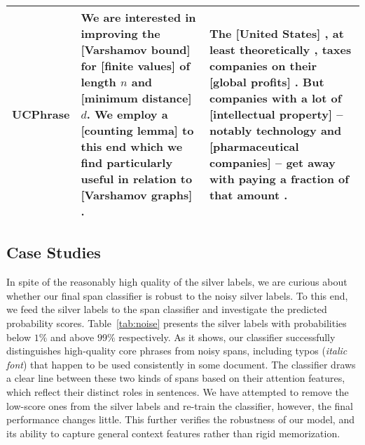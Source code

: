 \documentclass[sigconf]{acmart}
\newcommand{\our}{\mbox{UCPhrase}\xspace}
\newcommand{\catag}[1]{\textcolor{ggreen}{[\textbf{#1}]}}
\begin{document}
\begin{table*}[t]
{\begin{tabular}{@{}r@{\hskip 1em}p{}@{\hskip 2em}p{}@{}}
            \\
            \textbf{\our}
            &
            We are interested in improving the \catag{Varshamov bound} for \catag{finite values} of length $n$ and \catag{minimum distance} $d$. We employ a \catag{counting lemma} to this end which we find particularly useful in relation to \catag{Varshamov graphs} .
            &
            The \catag{United States} , at least theoretically , taxes companies on their \catag{global profits} .
            But companies with a lot of \catag{intellectual property} -- notably technology and \catag{pharmaceutical companies} -- get away with paying a fraction of that amount .
            \\
            
            
            
            \bottomrule
        \end{tabular}
        }
    \vspace{-3mm}
\end{table*} \subsection{Case Studies}
\label{sec:case_study}

In spite of the reasonably high quality of the silver labels, we are curious about whether our final span classifier is robust to the noisy silver labels.
To this end, we feed the silver labels to the span classifier and investigate the predicted probability scores.
Table~\ref{tab:noise} presents the silver labels with probabilities below $1\%$ and above $99\%$ respectively.
As it shows, our classifier successfully distinguishes high-quality core phrases from noisy spans, including typos (\emph{italic font}) that happen to be used consistently in some document.
The classifier draws a clear line between these two kinds of spans based on their attention features, which reflect their distinct roles in sentences.
We have attempted to remove the low-score ones from the silver labels and re-train the classifier, however, the final performance changes little.
This further verifies the robustness of our model, and its ability to capture general context features rather than rigid memorization.
\end{document}
